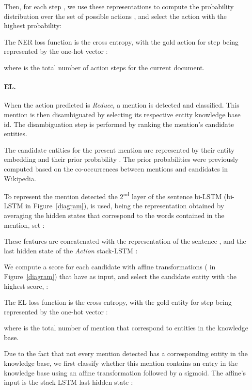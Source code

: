 \documentclass[11pt,a4paper,dvipsnames]{article}
\begin{document}
Then, for each step , we use these representations to compute the probability distribution  over the set of possible actions , and select the action  with the highest probability:



The NER loss function is the cross entropy, with the gold action for step  being represented by the one-hot vector :


where  is the total number of action steps for the current document.

\paragraph{EL.} When the action predicted is \textit{Reduce}, a mention is detected and classified. This mention is then disambiguated by selecting its respective entity knowledge base id. 
The disambiguation step is performed by ranking the mention's candidate entities.

The candidate entities  for the present mention are represented by their entity embedding  and their prior probability . The prior probabilities were previously computed based on the co-occurrences between mentions and candidates in Wikipedia.

To represent the mention detected the 2\textsuperscript{nd} layer of the sentence bi-LSTM (bi-LSTM in Figure~\ref{diagram}), is used, being the representation  obtained by averaging the hidden states  that correspond to the words contained in the mention, set :


These features are concatenated with the representation of the sentence , and the last hidden state of the \textit{Action} stack-LSTM :

We compute a score for each candidate with affine transformations ( in Figure~\ref{diagram}) that have  as input, and select the candidate entity with the highest score,  :


The EL loss function is the cross entropy, with the gold entity for step  being represented by the one-hot vector :


where  is the total number of mention that correspond to entities in the knowledge base.

Due to the fact that not every mention detected has a corresponding entity in the knowledge base, we first classify whether this mention contains an entry in the knowledge base using an affine transformation followed by a sigmoid. The affine's input is the stack LSTM last hidden state :
\end{document}
